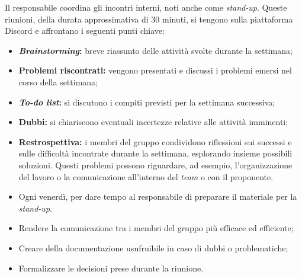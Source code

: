 \label{organizzare-meeting-interno}

Il responsabile coordina gli incontri interni, noti anche come \textit{stand-up}.
Queste riunioni, della durata approssimativa di 30 minuti, si tengono sulla piattaforma Discord e affrontano i seguenti punti chiave:
\begin{itemize}
	\item \textbf{\textit{Brainstorming}:} breve riassunto delle attività svolte durante la settimana;
	\item \textbf{Problemi riscontrati:} vengono presentati e discussi i problemi emersi nel corso della settimana;
	\item \textbf{\textit{To-do list}:} si discutono i compiti previsti per la settimana successiva;
	\item \textbf{Dubbi:} si chiariscono eventuali incertezze relative alle attività imminenti;
	\item \textbf{Restrospettiva:} i membri del gruppo condividono riflessioni sui successi e sulle difficoltà incontrate durante la settimana, esplorando insieme possibili soluzioni.
	      Questi problemi possono riguardare, ad esempio, l'organizzazione del lavoro o la comunicazione all'interno del \textit{team} o con il proponente.
\end{itemize}

\begin{itemize}
	\item Ogni venerdì, per dare tempo al responsabile di preparare il materiale
	      per la \textit{stand-up}.
\end{itemize}

\begin{itemize}
	\item Rendere la comunicazione tra i membri del gruppo più efficace ed
	      efficiente;

	\item Creare della documentazione usufruibile in caso di dubbi o
	      problematiche;

	\item Formalizzare le decisioni prese durante la riunione.
\end{itemize}

